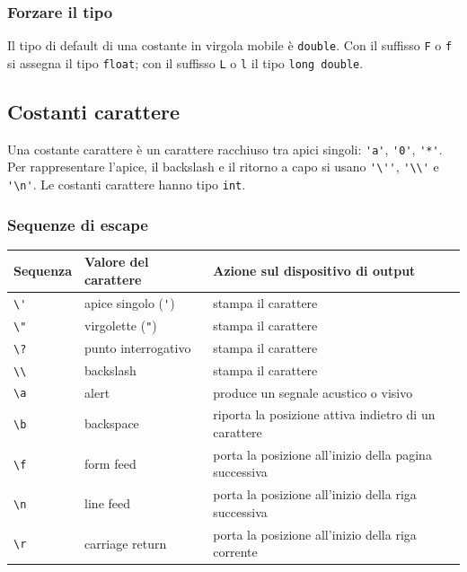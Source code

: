 \documentclass[11pt,a4paper]{article}
\begin{document}
\subsubsection{Forzare il tipo}

Il tipo di default di una costante in virgola mobile è \lstinline|double|. Con il suffisso \lstinline|F| o \lstinline|f| si assegna il tipo \lstinline|float|; con il suffisso \lstinline|L| o \lstinline|l| il tipo \lstinline|long double|.

\subsection{Costanti carattere}

Una costante carattere è un carattere racchiuso tra apici singoli: \lstinline|'a'|, \lstinline|'0'|, \lstinline|'*'|. Per rappresentare l'apice, il backslash e il ritorno a capo si usano \lstinline|'\''|, \lstinline|'\\'| e \lstinline|'\n'|. Le costanti carattere hanno tipo \lstinline|int|.

\subsubsection{Sequenze di escape}

\begin{center}
\begin{tabular}{@{}lll@{}}
\toprule
Sequenza & Valore del carattere & Azione sul dispositivo di output \\
\midrule
\verb|\'| & apice singolo (\lstinline|'|) & stampa il carattere \\
\verb|\"| & virgolette (\lstinline|"|) & stampa il carattere \\
\verb|\?| & punto interrogativo & stampa il carattere \\
\verb|\\| & backslash & stampa il carattere \\
\verb|\a| & alert & produce un segnale acustico o visivo \\
\verb|\b| & backspace & riporta la posizione attiva indietro di un carattere \\
\verb|\f| & form feed & porta la posizione all'inizio della pagina successiva \\
\verb|\n| & line feed & porta la posizione all'inizio della riga successiva \\
\verb|\r| & carriage return & porta la posizione all'inizio della riga corrente \\
\bottomrule
\end{tabular}
\end{center}
\end{document}
